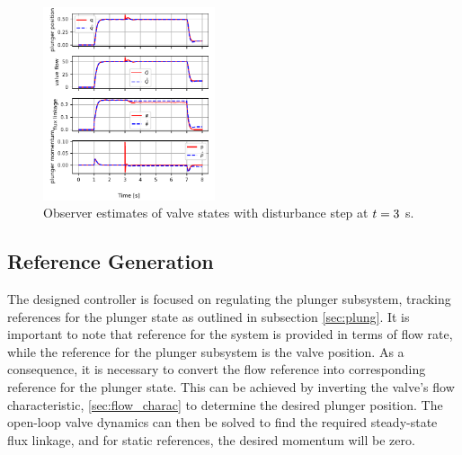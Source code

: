 \documentclass[letterpaper, 10pt, conference]{ieeeconf}
\begin{document}

\begin{figure}[!ht]
    \includegraphics[width=0.45\textwidth]{combined_plots_obs_F.pdf}
    \caption{Observer estimates of valve states with disturbance step at \protect$t=3\protect$ \unit{s}.}
    \label{fig:flowhat_F}
\end{figure}

\subsection{Reference Generation}
The designed controller is focused on regulating the plunger subsystem, tracking references for the plunger state as outlined in subsection \ref{sec:plung}. It is important to note that reference for the system is provided in terms of flow rate, while the reference for the plunger subsystem is the valve position. As a consequence, it is necessary to convert the flow reference into corresponding reference for the plunger state. This can be achieved by inverting the valve’s flow characteristic, \ref{sec:flow_charac} to determine the desired plunger position. The open-loop valve dynamics can then be solved to find the required steady-state flux linkage, and for static references, the desired momentum will be zero.
\end{document}
